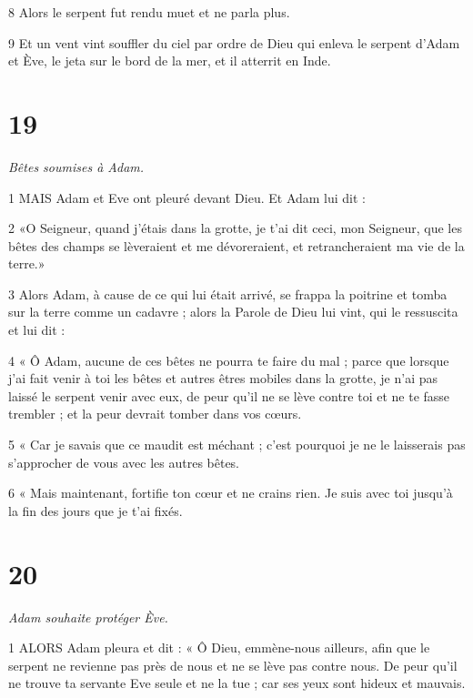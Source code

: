 \par 8 Alors le serpent fut rendu muet et ne parla plus.

\par 9 Et un vent vint souffler du ciel par ordre de Dieu qui enleva le serpent d'Adam et Ève, le jeta sur le bord de la mer, et il atterrit en Inde.

\chapter{19}

\par \textit{Bêtes soumises à Adam.}

\par 1 MAIS Adam et Eve ont pleuré devant Dieu. Et Adam lui dit :

\par 2 «O Seigneur, quand j'étais dans la grotte, je t'ai dit ceci, mon Seigneur, que les bêtes des champs se lèveraient et me dévoreraient, et retrancheraient ma vie de la terre.»

\par 3 Alors Adam, à cause de ce qui lui était arrivé, se frappa la poitrine et tomba sur la terre comme un cadavre ; alors la Parole de Dieu lui vint, qui le ressuscita et lui dit :

\par 4 « Ô Adam, aucune de ces bêtes ne pourra te faire du mal ; parce que lorsque j'ai fait venir à toi les bêtes et autres êtres mobiles dans la grotte, je n'ai pas laissé le serpent venir avec eux, de peur qu'il ne se lève contre toi et ne te fasse trembler ; et la peur devrait tomber dans vos cœurs.

\par 5 « Car je savais que ce maudit est méchant ; c'est pourquoi je ne le laisserais pas s'approcher de vous avec les autres bêtes.

\par 6 « Mais maintenant, fortifie ton cœur et ne crains rien. Je suis avec toi jusqu'à la fin des jours que je t'ai fixés.

\chapter{20}

\par \textit{Adam souhaite protéger Ève.}

\par 1 ALORS Adam pleura et dit : « Ô Dieu, emmène-nous ailleurs, afin que le serpent ne revienne pas près de nous et ne se lève pas contre nous. De peur qu'il ne trouve ta servante Eve seule et ne la tue ; car ses yeux sont hideux et mauvais.


